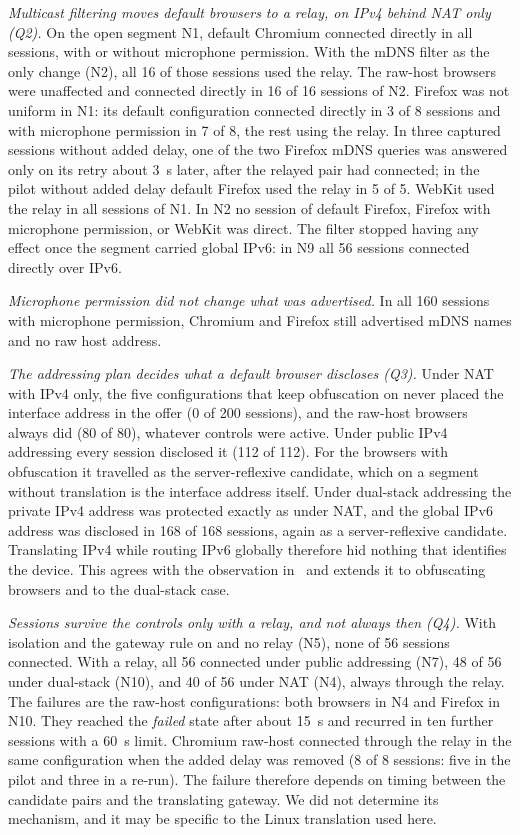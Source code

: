 \documentclass[conference]{IEEEtran}
\begin{document}
\textit{Multicast filtering moves default browsers to a relay, on IPv4 behind NAT only (Q2).} On the open segment N1, default Chromium connected directly in all sessions, with or without microphone permission. With the mDNS filter as the only change (N2), all 16 of those sessions used the relay. The raw-host browsers were unaffected and connected directly in 16 of 16 sessions of N2. Firefox was not uniform in N1: its default configuration connected directly in 3 of 8 sessions and with microphone permission in 7 of 8, the rest using the relay. In three captured sessions without added delay, one of the two Firefox mDNS queries was answered only on its retry about 3~s later, after the relayed pair had connected; in the pilot without added delay default Firefox used the relay in 5 of 5. WebKit used the relay in all sessions of N1. In N2 no session of default Firefox, Firefox with microphone permission, or WebKit was direct. The filter stopped having any effect once the segment carried global IPv6: in N9 all 56 sessions connected directly over IPv6.

\textit{Microphone permission did not change what was advertised.} In all 160 sessions with microphone permission, Chromium and Firefox still advertised mDNS names and no raw host address.

\textit{The addressing plan decides what a default browser discloses (Q3).} Under NAT with IPv4 only, the five configurations that keep obfuscation on never placed the interface address in the offer (0 of 200 sessions), and the raw-host browsers always did (80 of 80), whatever controls were active. Under public IPv4 addressing every session disclosed it (112 of 112). For the browsers with obfuscation it travelled as the server-reflexive candidate, which on a segment without translation is the interface address itself. Under dual-stack addressing the private IPv4 address was protected exactly as under NAT, and the global IPv6 address was disclosed in 168 of 168 sessions, again as a server-reflexive candidate. Translating IPv4 while routing IPv6 globally therefore hid nothing that identifies the device. This agrees with the observation in~\cite{nibert2025} and extends it to obfuscating browsers and to the dual-stack case.

\textit{Sessions survive the controls only with a relay, and not always then (Q4).} With isolation and the gateway rule on and no relay (N5), none of 56 sessions connected. With a relay, all 56 connected under public addressing (N7), 48 of 56 under dual-stack (N10), and 40 of 56 under NAT (N4), always through the relay. The failures are the raw-host configurations: both browsers in N4 and Firefox in N10. They reached the \textit{failed} state after about 15~s and recurred in ten further sessions with a 60~s limit. Chromium raw-host connected through the relay in the same configuration when the added delay was removed (8 of 8 sessions: five in the pilot and three in a re-run). The failure therefore depends on timing between the candidate pairs and the translating gateway. We did not determine its mechanism, and it may be specific to the Linux translation used here.
\end{document}
